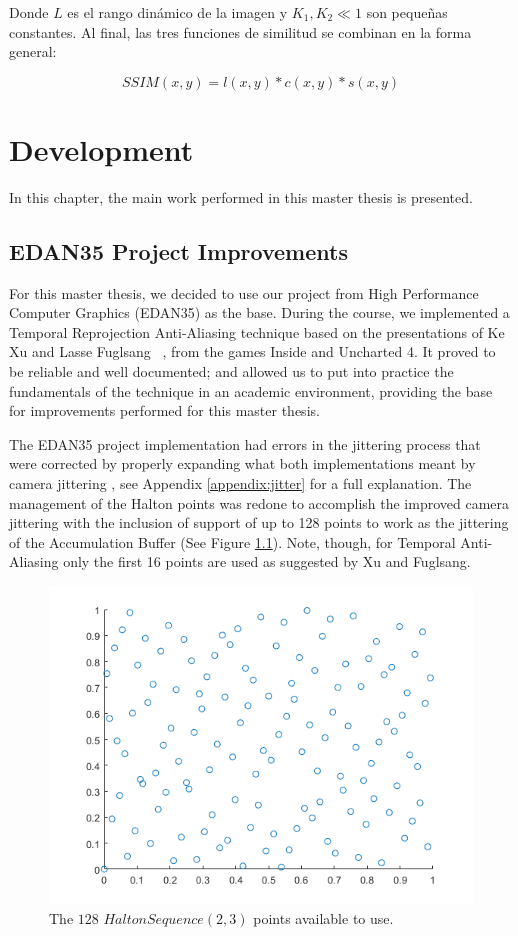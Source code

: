 \documentclass{cslthse-msc}
\begin{document}
Donde $L$ es el rango dinámico de la imagen y $K_1, K_2 \ll1$ son pequeñas constantes. Al final, las tres funciones de similitud se combinan en la forma general:

\begin{equation}\label{eq:ssim}
SSIM(x,y)=l(x,y)*c(x,y)*s(x,y)
\end{equation}



\chapter{Development}
In this chapter, the main work performed in this master thesis is presented.
\section{EDAN35 Project Improvements}
For this master thesis, we decided to use our project from High Performance Computer Graphics (EDAN35) as the base. During the course, we implemented a Temporal Reprojection Anti-Aliasing technique based on the presentations of Ke Xu and Lasse Fuglsang ~\cite{XU2016,Fuglsand2016}, from the games Inside and Uncharted 4. It proved to be reliable and well documented; and allowed us to put into practice the fundamentals of the technique in an academic environment, providing the base for improvements performed for this master thesis.

The EDAN35 project implementation had errors in the jittering process that were corrected by properly expanding what both implementations meant by camera jittering , see Appendix \ref{appendix:jitter} for a full explanation. The management of the Halton points was redone to accomplish the improved camera jittering with the inclusion of support of up to 128 points to work as the jittering of the Accumulation Buffer (See Figure \ref{fig:halton128}). Note, though, for Temporal Anti-Aliasing only the first 16 points are used as suggested by Xu and Fuglsang. ~\cite{XU2016,Fuglsand2016}

\begin{figure}[!hbt]
	\centering
	\includegraphics[scale=0.5]{images/halton_128.png}
	\caption{The $128$ $Halton Sequence (2,3)$ points available to use.}\label{fig:halton128}
\end{figure}
\end{document}
